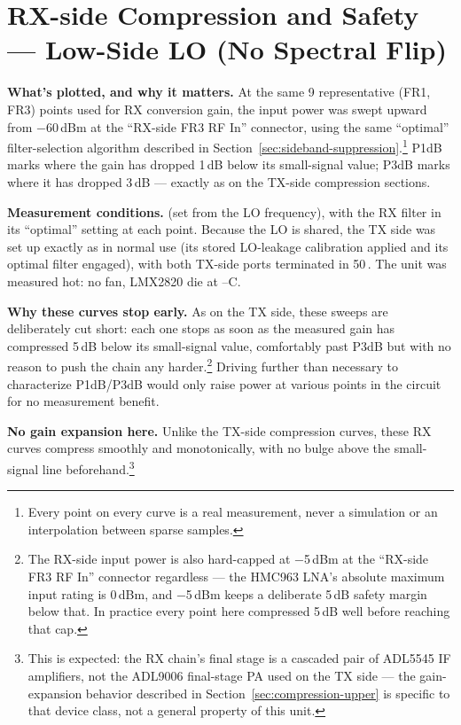 \clearpage
\section{RX-side Compression and Safety --- Low-Side LO (No Spectral Flip)}
\label{sec:rx-compression-lowside}

\textbf{What's plotted, and why it matters.} At the same 9 representative (FR1, FR3) points used for RX
conversion gain, the input power was swept upward from −60\,dBm at the ``RX-side FR3 RF In'' connector, using the
same ``optimal'' filter-selection algorithm described in Section~\ref{sec:sideband-suppression}.\footnote{Every
point on every curve is a real measurement, never a simulation or an interpolation between sparse samples.} P1dB marks where the gain has dropped 1\,dB below its small-signal value; P3dB
marks where it has dropped 3\,dB --- exactly as on the TX-side compression sections.

\textbf{Measurement conditions.} \lmxDriveRule{} (set from the LO frequency), with the RX filter in its ``optimal'' setting at each point. Because the LO is shared, the TX side was set up exactly as in normal use (its stored LO-leakage calibration applied and its optimal filter engaged), with both TX-side ports terminated in 50\,\textohm. The unit was measured hot: no fan, LMX2820 die at \condRxCompMinC--\condRxCompMaxC\textdegree C.

\textbf{Why these curves stop early.} As on the TX side, these sweeps are deliberately cut short: each one stops as soon as the measured gain has compressed
5\,dB below its small-signal value, comfortably past P3dB but with no reason to push the chain any
harder.\footnote{The RX-side input power is also hard-capped at −5\,dBm at the ``RX-side FR3 RF In'' connector
regardless --- the HMC963 LNA's absolute maximum input rating is 0\,dBm, and −5\,dBm keeps a deliberate 5\,dB
safety margin below that. In practice every point here compressed 5\,dB well before reaching that cap.} Driving
further than necessary to characterize P1dB/P3dB would only raise power at various points in the circuit for no
measurement benefit.

\textbf{No gain expansion here.} Unlike the TX-side compression curves, these RX curves compress smoothly and
monotonically, with no bulge above the small-signal line beforehand.\footnote{This is expected: the RX chain's
final stage is a cascaded pair of ADL5545 IF amplifiers, not the ADL9006 final-stage PA used on the TX side ---
the gain-expansion behavior described in Section~\ref{sec:compression-upper} is specific to that device class,
not a general property of this unit.}

